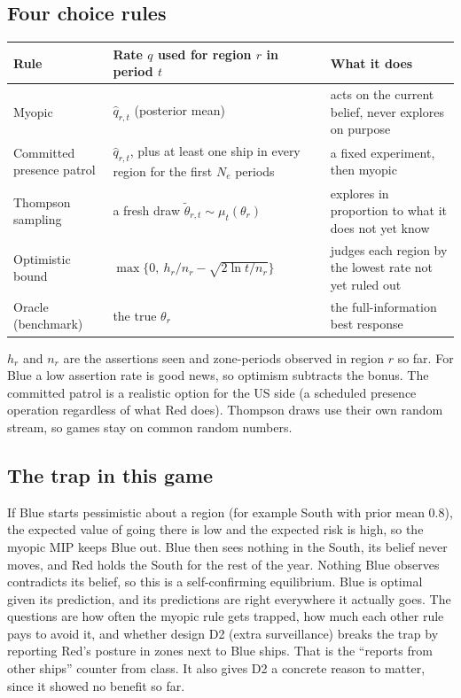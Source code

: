\documentclass[10pt]{article}
\newcommand{\1}{\mathbf{1}}
\begin{document}
\subsection{Four choice rules}
\begin{center}\small
\begin{tabular}{lll}
\toprule
Rule & Rate $q$ used for region $r$ in period $t$ & What it does\\\midrule
Myopic & $\hat q_{r,t}$ (posterior mean) & acts on the current belief, never explores on purpose\\
Committed presence patrol & $\hat q_{r,t}$, plus at least one ship in every region for the first $N_e$ periods & a fixed experiment, then myopic\\
Thompson sampling & a fresh draw $\tilde\theta_{r,t}\sim\mu_t(\theta_r)$ & explores in proportion to what it does not yet know\\
Optimistic bound & $\max\!\big\{0,\ h_r/n_r-\sqrt{2\ln t/n_r}\big\}$ & judges each region by the lowest rate not yet ruled out\\
Oracle (benchmark) & the true $\theta_r$ & the full-information best response\\
\bottomrule
\end{tabular}\end{center}
$h_r$ and $n_r$ are the assertions seen and zone-periods observed in region $r$ so far. For Blue a low assertion
rate is good news, so optimism subtracts the bonus. The committed patrol is a realistic option for the US side
(a scheduled presence operation regardless of what Red does). Thompson draws use their own random stream, so games
stay on common random numbers.

\subsection{The trap in this game}
If Blue starts pessimistic about a region (for example South with prior mean $0.8$), the expected value of
going there is low and the expected risk is high, so the myopic MIP keeps Blue out. Blue then sees nothing in the
South, its belief never moves, and Red holds the South for the rest of the year. Nothing Blue observes contradicts
its belief, so this is a self-confirming equilibrium. Blue is optimal given its prediction, and its predictions are
right everywhere it actually goes. The questions are how often the myopic rule gets trapped, how much each other
rule pays to avoid it, and whether design D2 (extra surveillance) breaks the trap by reporting Red's posture in zones
next to Blue ships. That is the ``reports from other ships'' counter from class. It also gives D2 a concrete reason
to matter, since it showed no benefit so far.
\end{document}
